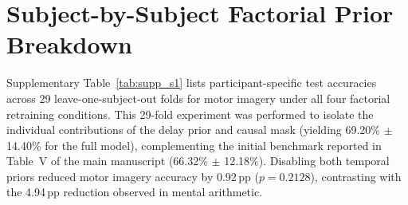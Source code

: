 \documentclass[journal]{IEEEtran}
\begin{document}
\section{Subject-by-Subject Factorial Prior Breakdown}
\label{sec:supp_breakdown}

Supplementary Table~\ref{tab:supp_s1} lists participant-specific test accuracies across 29 leave-one-subject-out folds for motor imagery under all four factorial retraining conditions. This 29-fold experiment was performed to isolate the individual contributions of the delay prior and causal mask (yielding 69.20\% $\pm$ 14.40\% for the full model), complementing the initial benchmark reported in Table~V of the main manuscript (66.32\% $\pm$ 12.18\%). Disabling both temporal priors reduced motor imagery accuracy by 0.92\,pp ($p = 0.2128$), contrasting with the 4.94\,pp reduction observed in mental arithmetic.
\end{document}
